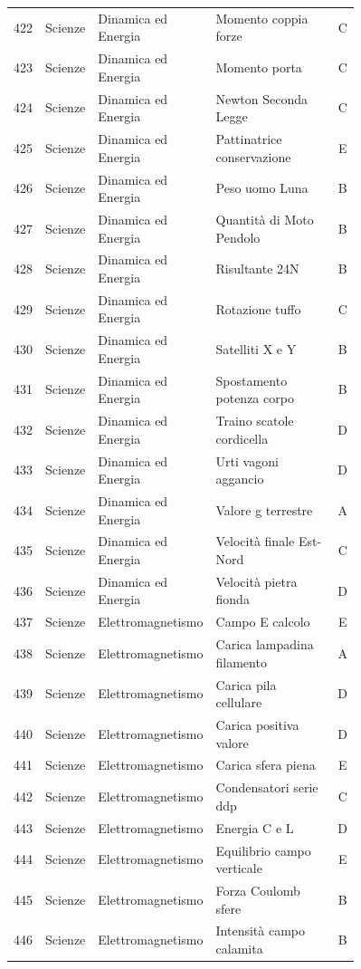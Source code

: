 \documentclass[20pt, a4paper]{article}
\begin{document}
\begin{longtable}{@{}r>{\raggedright\arraybackslash}p{0.14\linewidth}>{\raggedright\arraybackslash}p{0.20\linewidth}>{\raggedright\arraybackslash}p{0.42\linewidth}c@{}}
422 & Scienze & Dinamica ed Energia & Momento coppia forze & C \\
423 & Scienze & Dinamica ed Energia & Momento porta & C \\
424 & Scienze & Dinamica ed Energia & Newton Seconda Legge & C \\
425 & Scienze & Dinamica ed Energia & Pattinatrice conservazione & E \\
426 & Scienze & Dinamica ed Energia & Peso uomo Luna & B \\
427 & Scienze & Dinamica ed Energia & Quantità di Moto Pendolo & B \\
428 & Scienze & Dinamica ed Energia & Risultante 24N & B \\
429 & Scienze & Dinamica ed Energia & Rotazione tuffo & C \\
430 & Scienze & Dinamica ed Energia & Satelliti X e Y & B \\
431 & Scienze & Dinamica ed Energia & Spostamento potenza corpo & B \\
432 & Scienze & Dinamica ed Energia & Traino scatole cordicella & D \\
433 & Scienze & Dinamica ed Energia & Urti vagoni aggancio & D \\
434 & Scienze & Dinamica ed Energia & Valore g terrestre & A \\
435 & Scienze & Dinamica ed Energia & Velocità finale Est-Nord & C \\
436 & Scienze & Dinamica ed Energia & Velocità pietra fionda & D \\
437 & Scienze & Elettromagnetismo & Campo E calcolo & E \\
438 & Scienze & Elettromagnetismo & Carica lampadina filamento & A \\
439 & Scienze & Elettromagnetismo & Carica pila cellulare & D \\
440 & Scienze & Elettromagnetismo & Carica positiva valore & D \\
441 & Scienze & Elettromagnetismo & Carica sfera piena & E \\
442 & Scienze & Elettromagnetismo & Condensatori serie ddp & C \\
443 & Scienze & Elettromagnetismo & Energia C e L & D \\
444 & Scienze & Elettromagnetismo & Equilibrio campo verticale & E \\
445 & Scienze & Elettromagnetismo & Forza Coulomb sfere & B \\
446 & Scienze & Elettromagnetismo & Intensità campo calamita & B \\

\end{longtable}
\end{document}
